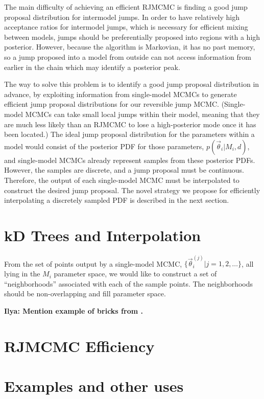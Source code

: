 \documentclass[prd,preprint]{revtex4}
\newcommand{\vtheta}{\vec{\theta}}
\newcommand{\ilya}[1]{{\color{red} \bf Ilya: #1}}
\begin{document}
The main difficulty of achieving an efficient RJMCMC is finding a good
jump proposal distribution for intermodel jumps.  In order to have
relatively high acceptance ratios for intermodel jumps, which is
necessary for efficient mixing between models, jumps should be
preferentially proposed into regions with a high posterior.  However,
because the algorithm is Markovian, it has no past memory, so a jump
proposed into a model from outside can not access information from
earlier in the chain which may identify a posterior peak.

The way to solve this problem is to identify a good jump proposal
distribution in advance, by exploiting information from single-model
MCMCs to generate efficient jump proposal distributions for our
reversible jump MCMC.  (Single-model MCMCs can take small local jumps
within their model, meaning that they are much less likely than an
RJMCMC to lose a high-posterior mode once it has been located.)  The
ideal jump proposal distribution for the parameters within a model
would consist of the posterior PDF for those parameters,
$p(\vtheta_i|M_i,d)$, and single-model MCMCs already represent samples
from these posterior PDFs.  However, the samples are discrete, and a
jump proposal must be continuous.  Therefore, the output of each
single-model MCMC must be interpolated to construct the desired jump
proposal.  The novel strategy we propose for efficiently interpolating
a discretely sampled PDF is described in the next section.

\section{kD Trees and Interpolation}
\label{sec:kDTree}

From the set of points output by a single-model MCMC,
$\{\vtheta_i^{(j)} | j = 1, 2, \ldots \}$, all lying in the $M_i$
parameter space, we would like to construct a set of ``neighborhoods''
associated with each of the sample points.  The neighborhoods should
be non-overlapping and fill parameter space.  

\ilya{Mention example of bricks from \cite{Littenberg2009}.}

\section{RJMCMC Efficiency}

\section{Examples and other uses} \label{sec:examples}
\end{document}
